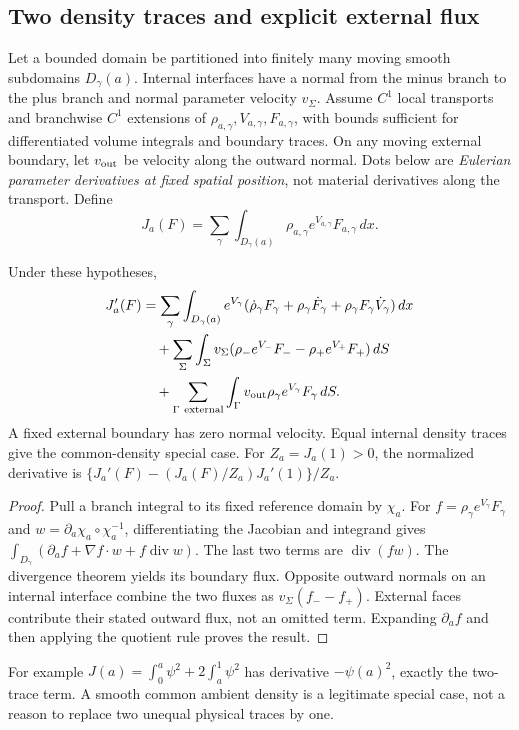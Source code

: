 \subsection{Two density traces and explicit external flux}
Let a bounded domain be partitioned into finitely many moving smooth subdomains $D_\gamma(a)$. Internal interfaces have a normal from the minus branch to the plus branch and normal parameter velocity $v_\Sigma$. Assume $C^1$ local transports and branchwise $C^1$ extensions of $\rho_{a,\gamma},V_{a,\gamma},F_{a,\gamma}$, with bounds sufficient for differentiated volume integrals and boundary traces. On any moving external boundary, let $v_{\rm out}$ be velocity along the outward normal. Dots below are \emph{Eulerian parameter derivatives at fixed spatial position}, not material derivatives along the transport. Define
\[
 J_a(F)=\sum_\gamma\int_{D_\gamma(a)}\rho_{a,\gamma}e^{V_{a,\gamma}}F_{a,\gamma}\,dx.
\]
\begin{theorem}\label{thm:traces}
Under these hypotheses,
\begin{align}
 J_a'(F)&=\sum_\gamma\int_{D_\gamma(a)}e^{V_\gamma}
 (\dot\rho_\gamma F_\gamma+\rho_\gamma\dot F_\gamma+
          \rho_\gamma F_\gamma\dot V_\gamma)\,dx\notag\\
 &\quad+\sum_\Sigma\int_\Sigma v_\Sigma
 (\rho_-e^{V_-}F_--\rho_+e^{V_+}F_+)\,dS\notag\\
 &\quad+\sum_{\Gamma\ {\rm external}}\int_\Gamma
              v_{\rm out}\rho_\gamma e^{V_\gamma}F_\gamma\,dS.
 \label{eq:two-traces}
\end{align}
A fixed external boundary has zero normal velocity. Equal internal density traces give the common-density special case. For $Z_a=J_a(1)>0$, the normalized derivative is
$\{J_a'(F)-(J_a(F)/Z_a)J_a'(1)\}/Z_a$.
\end{theorem}
\begin{proof}
Pull a branch integral to its fixed reference domain by $\chi_a$. For $f=\rho_\gamma e^{V_\gamma}F_\gamma$ and $w=\partial_a\chi_a\circ\chi_a^{-1}$, differentiating the Jacobian and integrand gives
$\int_{D_\gamma}(\partial_a f+\nabla f\cdot w+f\operatorname{div}w)$.
The last two terms are $\operatorname{div}(fw)$. The divergence theorem yields its boundary flux. Opposite outward normals on an internal interface combine the two fluxes as $v_\Sigma(f_--f_+)$. External faces contribute their stated outward flux, not an omitted term. Expanding $\partial_af$ and then applying the quotient rule proves the result.
\end{proof}
For example $J(a)=\int_0^a\psi^2+2\int_a^1\psi^2$ has derivative $-\psi(a)^2$, exactly the two-trace term. A smooth common ambient density is a legitimate special case, not a reason to replace two unequal physical traces by one.

